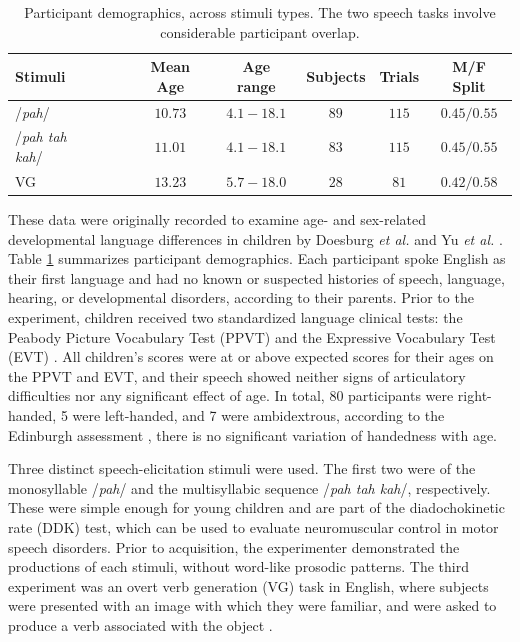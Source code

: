 \documentclass[fleqn,10pt]{wlscirep}
\begin{document}
\begin{table}[h]
  \centering
  \begin{tabular}{ l@{}c c c c c }
    \toprule
    \textbf{Stimuli} & \textbf{Mean Age} & \textbf{Age range} & \textbf{Subjects} & \textbf{Trials}  & \textbf{M/F Split} \\
    \midrule
    /{\em pah}/~~~                    & $10.73$ & $4.1-18.1$   &   $89$   &   $115$   &   $0.45/0.55$ \\
    /{\em pah tah kah}/~~~            & $11.01$ & $4.1-18.1$   &   $83$   &   $115$   &   $0.45/0.55$ \\
    VG~~~                             & $13.23$ & $5.7-18.0$   &   $28$   &   $81$    &   $0.42/0.58$  \\
    \bottomrule
  \end{tabular}
  \caption{Participant demographics, across stimuli types. The two speech tasks involve considerable participant overlap.}
  \label{tab:subjects}
\end{table}
These data were originally recorded to examine age- and sex-related developmental language differences in children by Doesburg {\em et al.} \cite{Doesburg2016} and Yu {\em et al.} \cite{Yu2014}. Table \ref{tab:subjects} summarizes participant demographics. Each participant spoke English as their first language and had no known or suspected histories of speech, language, hearing, or developmental disorders, according to their parents. Prior to the experiment, children received two standardized language clinical tests: the Peabody Picture Vocabulary Test (PPVT) \cite{Dunn97} and the Expressive Vocabulary Test (EVT) \cite{EVT}. All children's scores were at or above expected scores for their ages on the PPVT and EVT, and their speech showed neither signs of articulatory difficulties nor any significant effect of age. In total, 80 participants were right-handed, 5 were left-handed, and 7 were ambidextrous, according to the Edinburgh assessment \cite{Oldfield1971}, there is no significant variation of handedness with age.

Three distinct speech-elicitation stimuli were used. The first two were of the monosyllable /{\em pah}/ and the multisyllabic sequence /{\em pah tah kah}/, respectively. These were simple enough for young children and are part of the diadochokinetic rate (DDK) test, which can be used to evaluate neuromuscular control in motor speech disorders. Prior to acquisition, the experimenter demonstrated the productions of each stimuli, without word-like prosodic patterns. The third experiment was an overt verb generation (VG) task in English, where subjects were presented with an image with which they were familiar, and were asked to produce a verb associated with the object \cite{Doesburg2016}.
\end{document}
